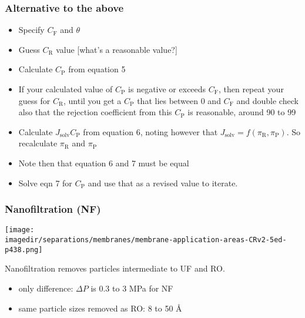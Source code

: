 \begin{frame}\frametitle{Alternative to the above}
	\begin{itemize}\item	Specify $C_\text{F}$ and $\theta$
		\item	Guess $C_\text{R}$ value [what's a reasonable value?]
		\item	Calculate $C_\text{P}$ from equation 5
		\item	If your calculated value of $C_\text{P}$ is negative or exceeds $C_\text{F}$, then repeat your guess for $C_\text{R}$, until you get a $C_\text{P}$ that lies between 0 and $C_\text{F}$ and double check also that the rejection coefficient from this $C_\text{P}$ is reasonable, around 90 to 99%
		\item	Calculate $J_\text{solv} C_\text{P}$ from equation 6, noting however that $J_\text{solv} = f(\pi_\text{R}, \pi_\text{P})$. So recalculate $\pi_\text{R}$ and $\pi_\text{P}$
		\item	Note then that equation 6 and 7 must be equal
		\item	Solve eqn 7 for $C_\text{P}$ and use that as a revised value to iterate.
	\end{itemize}
\end{frame}

\begin{frame}\frametitle{Nanofiltration (NF)}
	
	\begin{center}
		\texttt{[image: \\imagedir/separations/membranes/membrane-application-areas-CRv2-5ed-p438.png]}
	\end{center}	
	
	\vspace{24pt}
	
	Nanofiltration removes particles intermediate to UF and RO. 
	\begin{itemize}
		\item	only difference:  $\Delta P$ is 0.3 to 3 MPa for NF
		\item	same particle sizes removed as RO: 8 to 50 \AA
	\end{itemize}
\end{frame}

